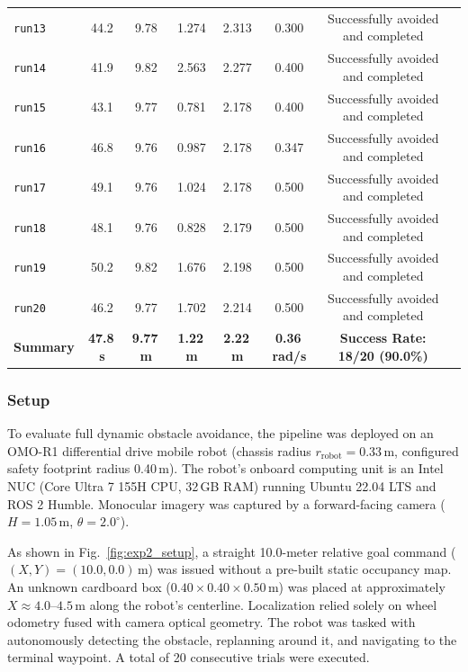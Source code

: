 \documentclass{ieeeaccess}
\begin{document}
\begin{table}[!t]
\begin{tabularx}{\textwidth}{lccccccX}
    \texttt{run13} & 44.2 & 9.78 & 1.274 & 2.313 & 0.300 & Successfully avoided and completed \\
    \texttt{run14} & 41.9 & 9.82 & 2.563 & 2.277 & 0.400 & Successfully avoided and completed \\
    \texttt{run15} & 43.1 & 9.77 & 0.781 & 2.178 & 0.400 & Successfully avoided and completed \\
    \texttt{run16} & 46.8 & 9.76 & 0.987 & 2.178 & 0.347 & Successfully avoided and completed \\
    \texttt{run17} & 49.1 & 9.76 & 1.024 & 2.178 & 0.500 & Successfully avoided and completed \\
    \texttt{run18} & 48.1 & 9.76 & 0.828 & 2.179 & 0.500 & Successfully avoided and completed \\
    \texttt{run19} & 50.2 & 9.82 & 1.676 & 2.198 & 0.500 & Successfully avoided and completed \\
    \texttt{run20} & 46.2 & 9.77 & 1.702 & 2.214 & 0.500 & Successfully avoided and completed \\
    \midrule
    \textbf{Summary} & \textbf{47.8\,s} & \textbf{9.77\,m} & \textbf{1.22\,m} & \textbf{2.22\,m} & \textbf{0.36\,rad/s} & \textbf{Success Rate: 18/20 (90.0\%)} \\
    \bottomrule
  \end{tabularx}
\end{table}

\subsubsection{Setup}
To evaluate full dynamic obstacle avoidance, the pipeline was deployed on an OMO-R1 differential drive mobile robot (chassis radius $r_{\mathrm{robot}} = 0.33$\,m, configured safety footprint radius 0.40\,m). The robot's onboard computing unit is an Intel NUC (Core Ultra 7 155H CPU, 32\,GB RAM) running Ubuntu 22.04 LTS and ROS 2 Humble. Monocular imagery was captured by a forward-facing camera ($H=1.05$\,m, $\theta=2.0^\circ$).

As shown in Fig.~\ref{fig:exp2_setup}, a straight 10.0-meter relative goal command ($(X, Y) = (10.0, 0.0)$\,m) was issued without a pre-built static occupancy map. An unknown cardboard box ($0.40 \times 0.40 \times 0.50$\,m) was placed at approximately $X \approx 4.0\text{--}4.5$\,m along the robot's centerline. Localization relied solely on wheel odometry fused with camera optical geometry. The robot was tasked with autonomously detecting the obstacle, replanning around it, and navigating to the terminal waypoint. A total of 20 consecutive trials were executed.
\end{document}
